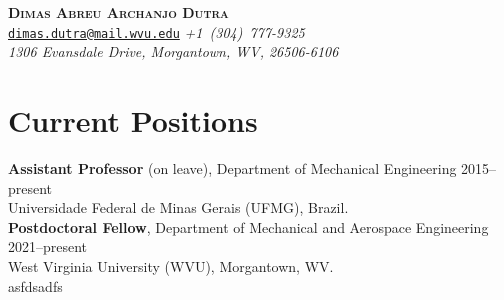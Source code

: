 \documentclass[a4paper, 11pt, oneside]{memoir}
\begin{document}
\thispagestyle{plain}

\begin{center}
  {
    \LARGE \bfseries \scshape 
    Dimas Abreu Archanjo Dutra
  }
  \\[1ex]
  \small
  \texttt{\href{mailto:dimas.dutra@mail.wvu.edu}{dimas.dutra@mail.wvu.edu}}
  \itshape\qquad
  +1~(304)~777-9325
  \\
  1306 Evansdale Drive, Morgantown, WV, 26506-6106
\end{center}

\section{Current Positions}
\textbf{Assistant Professor} (on leave), 
Department of Mechanical Engineering
\hfill 2015--present
\\
Universidade Federal de Minas Gerais (UFMG), Brazil.
\\[1ex]
\textbf{Postdoctoral Fellow}, 
Department of Mechanical and Aerospace Engineering
\hfill 2021--present
\\
West Virginia University (WVU), Morgantown, WV.\\


\clearpage
asfdsadfs
\end{document}
